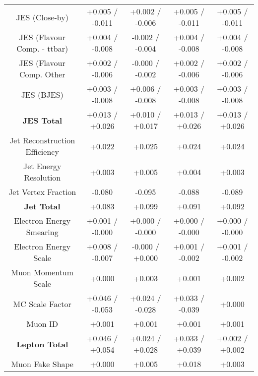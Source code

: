 \begin{table}[htbp]
\begin{center}
\begin{tabular}{|c|c|c|c|c|}
JES (Close-by)                        &+0.005   / -0.011   & +0.002   / -0.006   & +0.005   / -0.011   & +0.005   / -0.011  \\
JES (Flavour Comp. - ttbar)           &+0.004   / -0.008   & -0.002   / -0.004   & +0.004   / -0.008   & +0.004   / -0.008  \\
JES (Flavour Comp. Other              &+0.002   / -0.006   & -0.000   / -0.002   & +0.002   / -0.006   & +0.002   / -0.006  \\
JES (BJES)                            &+0.003   / -0.008   & +0.006   / -0.008   & +0.003   / -0.008   & +0.003   / -0.008  \\
\hline
\textbf{JES Total}                    &+0.013   / +0.026   & +0.010   / +0.017   & +0.013   / +0.026   & +0.013   / +0.026  \\
\hline
Jet Reconstruction Efficiency         &+0.022              & +0.025              & +0.024              & +0.024             \\
Jet Energy Resolution                 &+0.003              & +0.005              & +0.004              & +0.003             \\
Jet Vertex Fraction                   &-0.080              & -0.095              & -0.088              & -0.089             \\
\hline
\textbf{Jet Total}                    &+0.083              & +0.099              & +0.091              & +0.092             \\
\hline
Electron Energy Smearing              &+0.001   / -0.000   & +0.000   / -0.000   & +0.000   / -0.000   & +0.000   / -0.000  \\
Electron Energy Scale                 &+0.008   / -0.007   & -0.000   / +0.000   & +0.001   / -0.002   & +0.001   / -0.002  \\
Muon Momentum Scale                   &+0.000              & +0.003              & +0.001              & +0.002             \\
MC Scale Factor                       &+0.046   / -0.053   & +0.024   / -0.028   & +0.033   / -0.039   & +0.000             \\
Muon ID                               &+0.001              & +0.001              & +0.001              & +0.001             \\
\hline
\textbf{Lepton Total}                 &+0.046   / +0.054   & +0.024   / +0.028   & +0.033   / +0.039   & +0.002   / +0.002  \\
\hline
Muon Fake Shape                       &+0.000              & +0.005              & +0.018              & +0.003             \\

\end{tabular}
\end{center}
\end{table}
